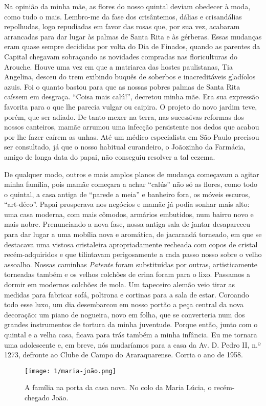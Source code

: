 Na opinião da minha mãe, as flores do nosso quintal deviam obedecer à moda, como tudo o mais. 
Lembro-me da fase dos crisântemos, dálias e crisandálias repolhudas, logo repudiadas em favor das rosas que, por sua vez, acabaram arrancadas para dar lugar às palmas de Santa Rita e às gérberas. 
Essas mudanças eram quase sempre decididas por volta do Dia de Finados, quando as parentes da Capital chegavam sobraçando as novidades compradas nas floriculturas do Arouche. 
Houve uma vez em que a matriarca das hostes paulistanas, Tia Angelina, desceu do trem exibindo buquês de soberbos e inacreditáveis gladíolos azuis. Foi o quanto bastou para que as nossas pobres palmas de Santa Rita caíssem em desgraça. 
``Coisa mais calú!'', decretou minha mãe. 
Era sua expressão favorita para o que lhe parecia vulgar ou caipira. O projeto do novo jardim teve, porém, que ser adiado. 
De tanto mexer na terra, nas sucessivas reformas dos nossos canteiros, mamãe arrumou uma infecção persistente nos dedos que acabou por lhe fazer caírem as unhas. 
Até um médico especialista em São Paulo precisou ser consultado, já que o nosso habitual curandeiro, o Joãozinho da Farmácia, amigo de longa data do papai, não conseguiu resolver a tal eczema.

De qualquer modo, outros e mais amplos planos de mudança começavam a agitar minha família, pois mamãe começara a achar ``calús'' não só as flores, como todo o quintal, a casa antiga de ``parede a meia'' e banheiro fora, os móveis escuros, ``art-déco''. 
Papai prosperava nos negócios e mamãe já podia sonhar mais alto: uma casa moderna, com mais cômodos, armários embutidos, num bairro novo e mais nobre. 
Prenunciando a nova fase, nossa antiga sala de jantar desapareceu para dar lugar a uma mobília nova e aromática, de jacarandá torneado, em que se destacava uma vistosa cristaleira apropriadamente recheada com copos de cristal recém-adquiridos e que tilintavam perigosamente a cada passo nosso sobre o velho assoalho. 
Nossas caminhas \textit{Patente} foram substituídas por outras, artisticamente torneadas também e os velhos colchões de crina foram para o lixo. 
Passamos a dormir em modernos colchões de mola. Um tapeceiro alemão veio tirar as medidas para fabricar sofá, poltrona e cortinas para a sala de estar. 
Coroando todo esse luxo, um dia desembarcou em nosso portão a peça central da nova decoração: um piano de nogueira, novo em folha, que se converteria num dos grandes instrumentos de tortura da minha juventude. 
Porque então, junto com o quintal e a velha casa, ficava para trás também a minha infância. 
Eu me tornara uma adolescente e, em breve, nós mudaríamos para a casa da Av. D. Pedro II, n.º 1273, defronte ao Clube de Campo do Araraquarense. Corria o ano de 1958.

\begin{figure}[H]
\centering
\texttt{[image: 1/maria-joão.png]}
\caption{A família na porta da casa nova. No colo da
Maria Lúcia, o recém-chegado João.}
\end{figure}